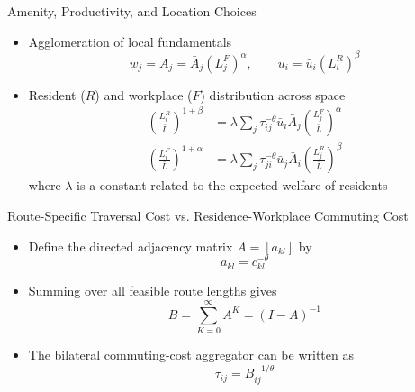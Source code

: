 \documentclass[11pt,aspectratio=169]{beamer}
\begin{document}
\begin{frame}{Amenity, Productivity, and Location Choices}
\begin{itemize}
  \item Agglomeration of local fundamentals
  \vspace{-0.5em}\begin{equation}\label{eq:agglom}
    w_j = A_j = \bar A_j\left(L_j^F\right)^\alpha, \qquad u_i=\bar u_i\left(L_i^R\right)^\beta
  \end{equation}
  \item Resident ($R$) and workplace ($F$) distribution across space
  \begin{align}
  \left( \frac{L_i^R}{\bar{L}}\right)^{1+\beta} & = \lambda \sum_j\tau_{ij}^{-\theta}\bar u_i\bar A_j \left(\frac{L_j^F}{\bar{L}}\right)^\alpha \label{eq:clear1} \\ 
  \left(\frac{L_i^F}{\bar{L}}\right)^{1+\alpha} & = \lambda \sum_j\tau_{ji}^{-\theta}\bar u_j\bar A_i \left(\frac{L_j^R}{\bar{L}}\right)^\beta \label{eq:clear2}
  \end{align}
  where $\lambda$ is a constant related to the expected welfare of residents
\end{itemize}
\end{frame}

\begin{frame}{Route-Specific Traversal Cost vs. Residence-Workplace Commuting Cost}
\begin{itemize}
  \item Define the directed adjacency matrix $A=[a_{kl}]$ by
  \vspace{-0.5em}\begin{equation}
    a_{kl} = c_{kl}^{-\theta}
  \end{equation}
  \item Summing over all feasible route lengths gives
  \vspace{-0.5em}\begin{equation}
    B = \sum_{K=0}^{\infty}A^K = (I-A)^{-1}
  \end{equation}
  \item The bilateral commuting-cost aggregator can be written as
  \vspace{-0.5em}\begin{equation}\label{eq:inverse}
    \tau_{ij} = B_{ij}^{-1/\theta}
  \end{equation}
\end{itemize}
\end{frame}
\end{document}
